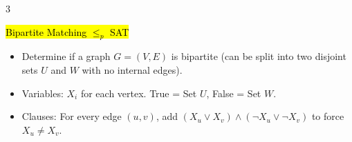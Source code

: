 \documentclass[letterpaper]{article}
\begin{document}
\begin{multicols*}{3}


    \hl{Bipartite Matching $\le_p$ SAT}
    \begin{itemize}
        \item Determine if a graph $G = (V,E)$ is bipartite (can be split into two disjoint sets $U$ and $W$ with no internal edges).
        \item Variables: $X_i$ for each vertex. True = Set $U$, False = Set $W$.
        \item Clauses: For every edge $(u,v)$, add $(X_u \vee X_v) \wedge (\neg X_u \vee \neg X_v)$ to force $X_u \ne X_v$.
    \end{itemize}


\end{multicols*}
\end{document}

